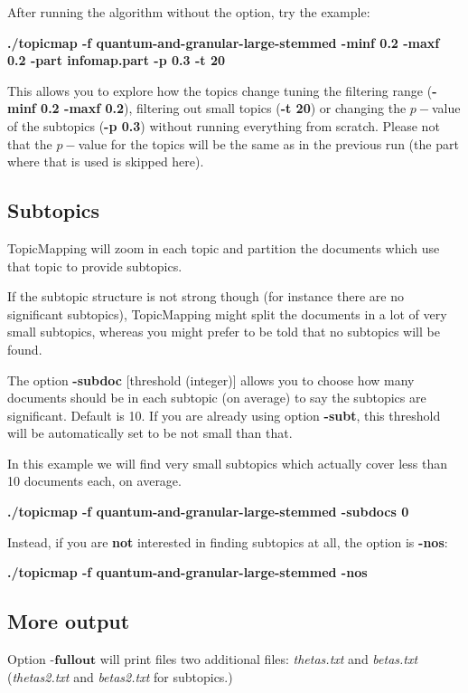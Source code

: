 \documentclass[11pt]{article}
\begin{document}
After running the algorithm without the option, try the example:

\textbf{./topicmap -f quantum-and-granular-large-stemmed -minf 0.2 -maxf 0.2 -part infomap.part -p 0.3 -t 20}

\small This allows you to explore how the topics change tuning the filtering range (\textbf{-minf 0.2 -maxf 0.2}), filtering out small topics (\textbf{-t 20}) or changing the $p-$value of the subtopics  (\textbf{-p 0.3}) without running everything from scratch. Please not that the $p-$value for the topics will be the same as in the previous run (the part where that is used is skipped here).
\normalsize
\subsection{Subtopics}

TopicMapping will zoom in each topic and partition the documents which use that topic to provide subtopics.


If the subtopic structure is not strong though (for instance there are no significant subtopics), TopicMapping might split the documents in a lot of very small subtopics, whereas you might prefer to be told that no subtopics will be found. 

The option \textbf{-subdoc} [threshold (integer)] allows you to choose how many documents should be in each subtopic (on average) to say the subtopics are significant. Default is 10. \small{If you are already using option \textbf{-subt}, this threshold will be automatically set to be not small than that}. \normalsize{}

In this example we will find very small subtopics which actually cover less than 10 documents each, on average.

\textbf{./topicmap -f quantum-and-granular-large-stemmed -subdocs 0}

Instead, if you are \textbf{not} interested in finding subtopics at all,  the option is \textbf{-nos}:

\textbf{./topicmap -f quantum-and-granular-large-stemmed -nos}


\subsection{More output}

Option $\textbf{-fullout}$ will print files two additional files: \textit{thetas.txt} and \textit{betas.txt} (\textit{thetas2.txt} and \textit{betas2.txt} for subtopics.)
\end{document}
